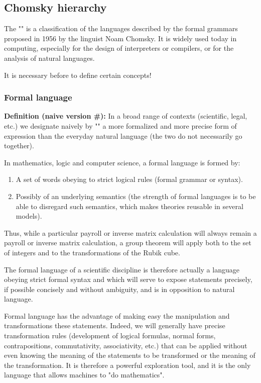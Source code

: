 	\pagebreak
	\subsection{Chomsky hierarchy}
	The "" is a classification of the languages described by the formal grammars proposed in 1956 by the linguist Noam Chomsky. It is widely used today in computing, especially for the design of interpreters or compilers, or for the analysis of natural languages.
	
	It is necessary before to define certain concepts!
	
	\subsubsection{Formal language}
	\textbf{Definition (naive version \#\mydef):} In a broad range of contexts (scientific, legal, etc.) we designate naively by "" a more formalized and more precise form of expression than the everyday natural language (the two do not necessarily go together).
	
	In mathematics, logic and computer science, a formal language is formed by:
	\begin{enumerate}
	 	\item A set of words obeying to strict logical rules (formal grammar or syntax).

		\item Possibly of an underlying semantics (the strength of formal languages is to be able to disregard such semantics, which makes theories reusable in several models).
	\end{enumerate}
	\begin{tcolorbox}[title=Remark,colframe=black,arc=10pt]
	Thus, while a particular payroll or inverse matrix calculation will always remain a payroll or inverse matrix calculation, a group theorem will apply both to the set of integers and to the transformations of the Rubik cube.
	\end{tcolorbox}
	The formal language of a scientific discipline is therefore actually a language obeying strict formal syntax and which will serve to expose statements precisely, if possible concisely and without ambiguity, and is in opposition to natural language.

	Formal language has the advantage of making easy the manipulation and transformations these statements. Indeed, we will generally have precise transformation rules (development of logical formulas, normal forms, contrapositions, commutativity, associativity, etc.) that can be applied without even knowing the meaning of the statements to be transformed or the meaning of the transformation. It is therefore a powerful exploration tool, and it is the only language that allows machines to "do mathematics".

